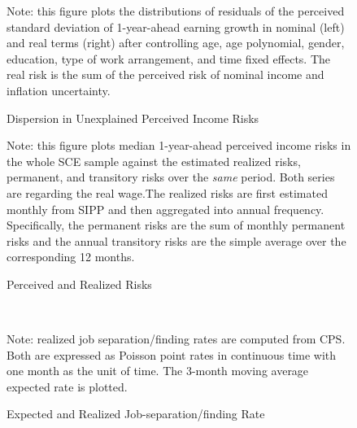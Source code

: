         \begin{figure}[!ht]
    \caption{Dispersion in Unexplained Perceived Income Risks}
    \label{fig:histmoms}
	\begin{center}
\end{center}
    \begin{flushleft}Note: this figure plots the distributions of residuals of the perceived standard deviation of 1-year-ahead earning growth in nominal (left) and real terms (right) after controlling age, age polynomial, gender, education, type of work arrangement, and time fixed effects. The real risk is the sum of the perceived risk of nominal income and inflation uncertainty.\end{flushleft}
    \end{figure}
    
    \clearpage
    
    \begin{figure}[!ht]
    	\caption{Perceived and Realized Risks}
    	\label{fig:ts_compare}
    	\begin{center}
    		\vbiskip
    	\vbiskip
    	\end{center}
    \begin{flushleft}Note: this figure plots median 1-year-ahead perceived income risks in the whole SCE sample against the estimated realized risks, permanent, and transitory risks over the \emph{same} period. Both series are regarding the real wage.The realized risks are first estimated monthly from SIPP and then aggregated into annual frequency. Specifically, the permanent risks are the sum of monthly permanent risks and the annual transitory risks are the simple average over the corresponding 12 months.\end{flushleft}
    \end{figure}
    
  

     
    \clearpage
    \begin{figure}[!ht]
      \caption{Expected and Realized Job-separation/finding Rate}
    \label{fig:srate_compare}
    	\begin{center} \\
    	\medskip
    	\end{center}
    \begin{flushleft}Note: realized job separation/finding rates are computed from CPS. Both are expressed as Poisson point rates in continuous time with one month as the unit of time. The 3-month moving average expected rate is plotted.\end{flushleft}
    \end{figure}
    
